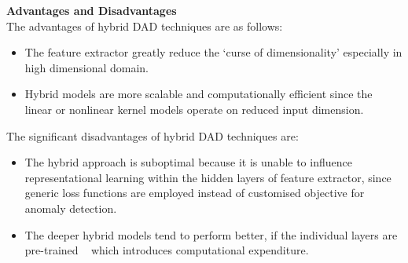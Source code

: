 \textbf{Advantages and Disadvantages }\\
The advantages of hybrid DAD techniques are as follows:
\begin{itemize}
\item  The feature extractor greatly reduce the ‘curse of dimensionality’ especially in high dimensional domain.
\item  Hybrid models are  more scalable and computationally efficient since the linear or nonlinear kernel models operate on reduced input dimension.
\end{itemize}
The significant disadvantages of hybrid DAD techniques are:
\begin{itemize}
\item  The hybrid approach is suboptimal because it is unable to influence representational learning within the hidden layers of feature extractor, since generic loss functions are employed instead of  customised objective for anomaly detection.
\item The deeper hybrid models tend to perform better, if the individual layers are pre-trained ~\cite{saxe2011random} which introduces computational expenditure.
\end{itemize}












